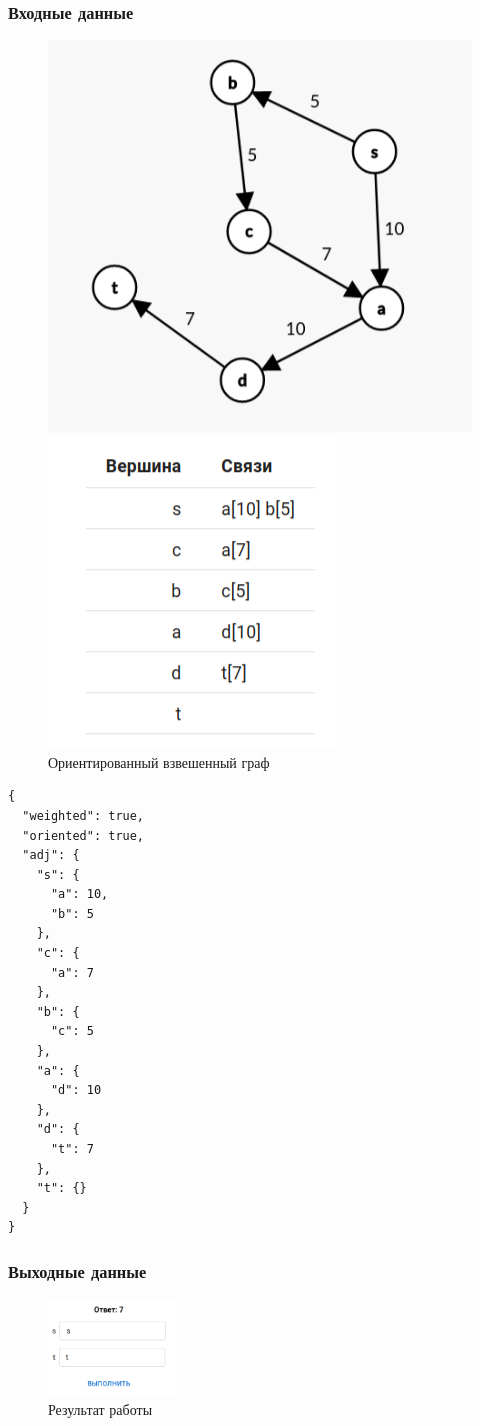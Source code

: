 \subsubsection{Входные данные}
\begin{figure}[H]
  \begin{minipage}{0.5\textwidth}
    \centering\includegraphics[width=0.8\linewidth]{figs/task-11/graph-ff-3.png}
  \end{minipage}
  \begin{minipage}{0.5\textwidth}
    \centering\includegraphics[width=0.6\linewidth]{figs/task-11/adj-ff-3.png}
  \end{minipage}
  \caption{Ориентированный взвешенный граф}
\end{figure}

\begin{verbatim}
{
  "weighted": true,
  "oriented": true,
  "adj": {
    "s": {
      "a": 10,
      "b": 5
    },
    "c": {
      "a": 7
    },
    "b": {
      "c": 5
    },
    "a": {
      "d": 10
    },
    "d": {
      "t": 7
    },
    "t": {}
  }
}
\end{verbatim}

\subsubsection{Выходные данные}
\begin{figure}[H]
  \centering\includegraphics[width=0.3\textwidth]{figs/task-11/res-ff-3.png}
  \caption{Результат работы}
\end{figure}